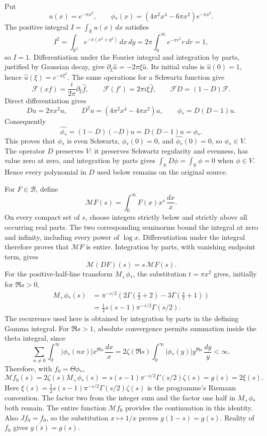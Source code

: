 Put
\[
u(x)=e^{-\pi x^2},\qquad
\phi_*(x)=(4\pi^2x^4-6\pi x^2)e^{-\pi x^2}.
\]
The positive integral \(I=\int_{\mathbb R}u(x)\,dx\)
satisfies
\[
I^2=\int_{\mathbb R^2}e^{-\pi(x^2+y^2)}\,dx\,dy
=2\pi\int_0^\infty e^{-\pi r^2}r\,dr=1,
\]
so \(I=1\). Differentiation under the Fourier integral
and integration by parts, justified by Gaussian decay,
give \(\partial_\xi\widehat u=-2\pi\xi\widehat u\).
Its initial value is \(\widehat u(0)=1\), hence
\(\widehat u(\xi)=e^{-\pi\xi^2}\).
The same operations for a Schwartz function give
\[
\mathcal F(xf)=\frac{i}{2\pi}\partial_\xi\widehat f,
\qquad \mathcal F(f')=2\pi i\xi\widehat f,
\qquad \mathcal F D=(1-D)\mathcal F.
\]
Direct differentiation gives
\[
Du=2\pi x^2u,\qquad
D^2u=(4\pi^2x^4-4\pi x^2)u,\qquad
\phi_*=D(D-1)u.
\]
Consequently
\[
\widehat{\phi_*}
=(1-D)(-D)u=D(D-1)u=\phi_*.
\]
This proves that \(\phi_*\) is even Schwartz,
\(\phi_*(0)=0\), and
\(\widehat{\phi_*}(0)=0\), so \(\phi_*\in V\).
The operator \(D\) preserves \(V\): it preserves
Schwartz regularity and evenness, has value zero at zero,
and integration by parts gives
\(\int_{\mathbb R}D\phi=\int_{\mathbb R}\phi=0\)
when \(\phi\in V\). Hence every polynomial in \(D\)
used below remains on the original source.

For \(F\in\mathscr B\), define
\[
\mathcal MF(s)=\int_0^\infty F(x)x^s\,\frac{dx}{x}.
\]
On every compact set of \(s\), choose integers strictly
below and strictly above all occurring real parts.
The two corresponding seminorms bound the integral
at zero and infinity, including every power of
\(\log x\). Differentiation under the integral
therefore proves that \(\mathcal MF\) is entire.
Integration by parts, with vanishing endpoint term,
gives
\[
\mathcal M(DF)(s)=s\,\mathcal MF(s).
\]
For the positive-half-line transform \(M_+\phi_*\),
the substitution \(t=\pi x^2\) gives, initially for
\(\Re s>0\),
\[
\begin{aligned}
M_+\phi_*(s)
&=\pi^{-s/2}
\left(2\Gamma\left(\frac s2+2\right)
-3\Gamma\left(\frac s2+1\right)\right)\\
&=\frac12s(s-1)\pi^{-s/2}\Gamma(s/2).
\end{aligned}
\]
The recurrence used here is obtained by integration
by parts in the defining Gamma integral. For
\(\Re s>1\), absolute convergence permits summation
inside the theta integral, since
\[
\sum_{n\ne0}\int_0^\infty
|\phi_*(nx)|x^{\Re s}\,\frac{dx}{x}
=2\zeta(\Re s)\int_0^\infty
|\phi_*(y)|y^{\Re s}\,\frac{dy}{y}<\infty.
\]
Therefore, with \(f_0=\Theta\phi_*\),
\[
\mathcal Mf_0(s)
=2\zeta(s)M_+\phi_*(s)
=s(s-1)\pi^{-s/2}\Gamma(s/2)\zeta(s)
=g(s)=2\xi(s).
\]
Here \(\xi(s)=\tfrac12s(s-1)\pi^{-s/2}
\Gamma(s/2)\zeta(s)\) is the programme's Riemann
convention. The factor two from the integer sum
and the factor one half in \(M_+\phi_*\) both remain.
The entire function \(\mathcal Mf_0\) provides the
continuation in this identity. Also \(Jf_0=f_0\),
so the substitution \(x\mapsto1/x\) proves
\(g(1-s)=g(s)\). Reality of \(f_0\) gives
\(\overline{g(\bar s)}=g(s)\).

